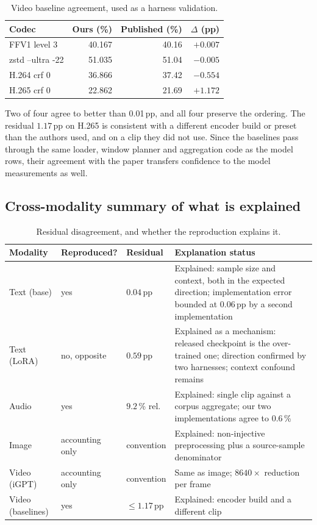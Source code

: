 \documentclass[11pt,a4paper]{article}
\begin{document}
\begin{table}[htbp]
\centering
\small
\caption{Video baseline agreement, used as a harness validation.}
\label{tab:videocheck}
\begin{tabular}{lrrr}
\toprule
Codec & Ours (\%) & Published (\%) & $\Delta$ (pp) \\
\midrule
FFV1 level 3 & 40.167 & 40.16 & $+0.007$ \\
zstd --ultra -22 & 51.035 & 51.04 & $-0.005$ \\
H.264 crf 0 & 36.866 & 37.42 & $-0.554$ \\
H.265 crf 0 & 22.862 & 21.69 & $+1.172$ \\
\bottomrule
\end{tabular}
\end{table}

Two of four agree to better than \num{0.01}\,pp, and all four preserve the
ordering. The residual $1.17$\,pp on H.265 is consistent with a different encoder
build or preset than the authors used, and on a clip they did not use. Since the
baselines pass through the same loader, window planner and aggregation code as the
model rows, their agreement with the paper transfers confidence to the model
measurements as well.

\subsection{Cross-modality summary of what is explained}

\begin{table}[htbp]
\centering
\small
\caption{Residual disagreement, and whether the reproduction explains it.}
\label{tab:residual}
\begin{tabularx}{\textwidth}{L{2.4cm}L{2.2cm}L{2.4cm}X}
\toprule
Modality & Reproduced? & Residual & Explanation status \\
\midrule
Text (base) & yes & $0.04$\,pp & Explained: sample size and context, both in the
  expected direction; implementation error bounded at $0.06$\,pp by a second
  implementation \\
Text (LoRA) & no, opposite & $0.59$\,pp & Explained as a mechanism: released
  checkpoint is the over-trained one; direction confirmed by two harnesses;
  context confound remains \\
Audio & yes & $9.2$\,\% rel. & Explained: single clip against a corpus aggregate;
  our two implementations agree to $0.6$\,\% \\
Image & accounting only & convention & Explained: non-injective preprocessing plus
  a source-sample denominator \\
Video (iGPT) & accounting only & convention & Same as image; $8640\times$
  reduction per frame \\
Video (baselines) & yes & $\le1.17$\,pp & Explained: encoder build and a
  different clip \\
\bottomrule
\end{tabularx}
\end{table}
\end{document}
